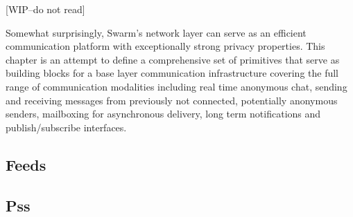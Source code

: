 [WIP--do not read]

Somewhat surprisingly, Swarm's network layer can serve as  an efficient  communication platform with exceptionally strong privacy properties. This chapter is an attempt to define a comprehensive set of primitives that serve as building blocks for a base layer communication infrastructure covering the full range of communication modalities including real time anonymous chat, sending and receiving messages from previously not connected, potentially anonymous senders, mailboxing for asynchronous delivery, long term notifications and  publish/subscribe interfaces. 

\subsection{Feeds}\label{sec:feeds-ux}
\subsection{Pss}\label{sec:pss-ux}


